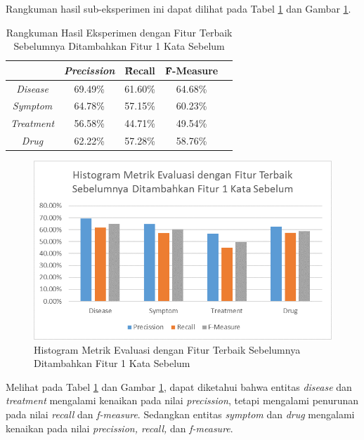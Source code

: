 	Rangkuman hasil sub-eksperimen ini dapat dilihat pada Tabel \ref{table:owndict7} dan Gambar \ref{fig:owndict7}.
	
	\begin{table}
		\centering
		\caption{Rangkuman Hasil Eksperimen dengan Fitur Terbaik Sebelumnya Ditambahkan Fitur 1 Kata Sebelum}
		\begin{tabular}{|c|c|c|c|c|}
			\hline
		                          & \textit{Precission} & \f{\f{Recall}} & \f{\f{F-Measure}} \\ \hline
			\textit{Disease}      & 69.49\%             & 61.60\%        & 64.68\%           \\ \hline
			\textit{Symptom}      & 64.78\%             & 57.15\%        & 60.23\%           \\ \hline
			\textit{Treatment}    & 56.58\%             & 44.71\%        & 49.54\%           \\ \hline
			\textit{Drug}		  & 62.22\%             & 57.28\%        & 58.76\%           \\ \hline
		\end{tabular}
		\label{table:owndict7}
	\end{table}
	
	\begin{figure}
		\centering
		\includegraphics[width=\linewidth]{images/histogram7}
		\caption{Histogram Metrik Evaluasi dengan Fitur Terbaik Sebelumnya Ditambahkan Fitur 1 Kata Sebelum}
		\label{fig:owndict7}
	\end{figure}
	
	Melihat pada Tabel \ref{table:owndict7} dan Gambar \ref{fig:owndict7}, dapat diketahui bahwa entitas \textit{disease} dan \textit{treatment} mengalami kenaikan pada nilai \textit{precission}, tetapi mengalami penurunan pada nilai \textit{recall} dan \textit{f-measure}. Sedangkan entitas \textit{symptom} dan \textit{drug} mengalami kenaikan pada nilai \textit{precission, recall,} dan \textit{f-measure}.
	
